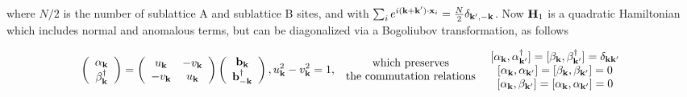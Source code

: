 where $N/2$ is the number of sublattice A and sublattice B sites, and with $\sum_{i} e^{i ({\bf k+k'}) \cdot {\bf x}_i} = \frac{N}{2} \delta_{{\bf k',-k}}$. Now ${\bf H}_1$ is a quadratic Hamiltonian which includes normal and anomalous terms, but can be diagonalized via a Bogoliubov transformation, as follows 

\begin{equation}
    \left( \begin{array}{c}
     \alpha_{{\bf k}} \\
     \beta_{{\bf k}}^\dagger
\end{array} \right) = \left(\begin{array}{cc}
   u_{{\bf k}}  & -v_{{\bf k}} \\
   -v_{{\bf k}}  & u_{{\bf k}}
\end{array} \right) \left(\begin{array}{c}
   {\bf b}_{{\bf k}}   \\
    {\bf b}^\dagger_{-{\bf k}} 
\end{array} \right), u^2_{{\bf k}} - v^2_{{\bf k}} = 1,
\begin{array}{cc}
     \textnormal{ which preserves  } \\
     \textnormal{ the commutation relations }
\end{array} \begin{array}{c}
     \textnormal{[}\alpha_{{\bf k}}, \alpha^\dagger_{{\bf k}'}\textnormal{]} = \textnormal{[}\beta_{{\bf k}}, \beta^\dagger_{{\bf k}'}\textnormal{]} = \delta_{{\bf k k'}} \\
     \textnormal{[}\alpha_{{\bf k}}, \alpha_{{\bf k}'}\textnormal{]} = [\beta_{{\bf k}}, \beta_{{\bf k}'}\textnormal{]} = 0 \\
     \textnormal{[}\alpha_{{\bf k}}, \beta_{{\bf k}'}\textnormal{]} = \textnormal{[}\alpha_{{\bf k}}, \alpha_{{\bf k}'}\textnormal{]} = 0
\end{array}
\end{equation} 


